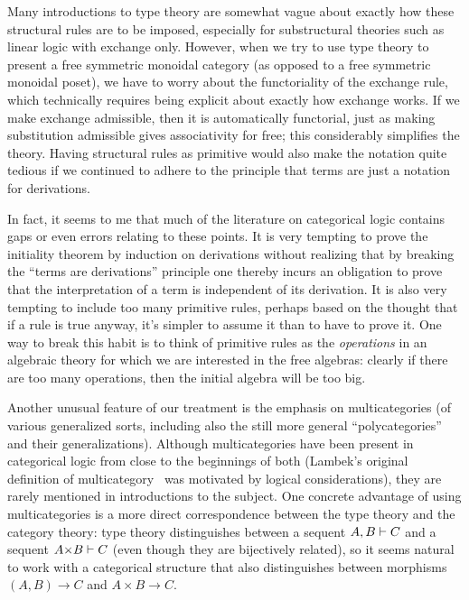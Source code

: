 Many introductions to type theory are somewhat vague about exactly how these structural rules are to be imposed, especially for substructural theories such as linear logic with exchange only.
However, when we try to use type theory to present a free symmetric monoidal category (as opposed to a free symmetric monoidal poset), we have to worry about the functoriality of the exchange rule, which technically requires being explicit about exactly how exchange works.
If we make exchange admissible, then it is automatically functorial, just as making substitution admissible gives associativity for free; this considerably simplifies the theory.
Having structural rules as primitive would also make the notation quite tedious if we continued to adhere to the principle that terms are just a notation for derivations.

In fact, it seems to me that much of the literature on categorical logic contains gaps or even errors relating to these points.
It is very tempting to prove the initiality theorem by induction on derivations without realizing that by breaking the ``terms are derivations'' principle one thereby incurs an obligation to prove that the interpretation of a term is independent of its derivation.
It is also very tempting to include too many primitive rules, perhaps based on the thought that if a rule is true anyway, it's simpler to assume it than to have to prove it.
One way to break this habit is to think of primitive rules as the \emph{operations} in an algebraic theory for which we are interested in the free algebras: clearly if there are too many operations, then the initial algebra will be too big.

Another unusual feature of our treatment is the emphasis on multicategories (of various generalized sorts, including also the still more general ``polycategories'' and their generalizations).
Although multicategories have been present in categorical logic from close to the beginnings of both (Lambek's original definition of multicategory~\cite{lambek:dedsys-ii} was motivated by logical considerations), they are rarely mentioned in introductions to the subject.
One concrete advantage of using multicategories is a more direct correspondence between the type theory and the category theory: type theory distinguishes between a sequent $A,B\vdash C$ and a sequent $A\times B\types C$ (even though they are bijectively related), so it seems natural to work with a categorical structure that also distinguishes between morphisms $(A,B)\to C$ and $A\times B\to C$.

